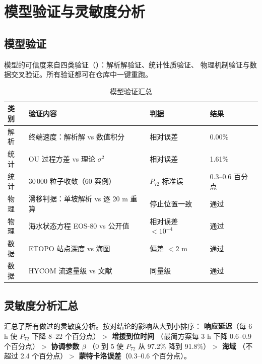 \section{模型验证与灵敏度分析}

\subsection{模型验证}

模型的可信度来自四类验证（）：解析解验证、统计性质验证、
物理机制验证与数据交叉验证。所有验证都可在仓库中一键重跑。

\begin{table}[H]
\centering\small
\caption{模型验证汇总}
\label{tab:allverify}
\begin{tabular}{@{}llll@{}}
\toprule
类别 & 验证内容 & 判据 & 结果\\
\midrule
解析 & 终端速度：解析解 vs 数值积分 & 相对误差 & 0.00\%\\
统计 & OU 过程方差 vs 理论 $\sigma^2$ & 相对误差 & 1.61\%\\
统计 & 30\,000 粒子收敛（60 案例） & $P_{72}$ 标准误 & 0.3--0.6 百分点\\
物理 & 滑移判据：单坡解析 vs 逐 20 m 重算 & 停止位置一致 & 通过\\
物理 & 海水状态方程 EOS-80 vs 公开值 & 相对误差 $<10^{-4}$ & 通过\\
数据 & ETOPO 站点深度 vs 海图 & 偏差 $<2$ m & 通过\\
数据 & HYCOM 流速量级 vs 文献 & 同量级 & 通过\\
\bottomrule
\end{tabular}
\end{table}

\subsection{灵敏度分析汇总}

 汇总了所有做过的灵敏度分析。按对结论的影响从大到小排序：
\textbf{响应延迟}（每 6 h 使 $P_{72}$ 下降 8--22 个百分点）$>$ \textbf{增援到位时间}
（最简方案每 3 h 下降 0.6--0.9 个百分点）$>$ \textbf{协调参数 $\beta$}
（0 到 5 使 $P_{72}$ 从 97.2\% 降到 91.8\%）$>$ \textbf{海域}
（不超过 2.4 个百分点）$>$ \textbf{蒙特卡洛误差}（0.3--0.6 个百分点）。

